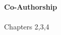 \thispagestyle{fancy}

\textrm{}\\\\
\noindent\textbf{\huge\textsf{Co-Authorship}}\\\\

\noindent 
Chapters 2,3,4
\newpage
\thispagestyle{empty}
\mbox{}